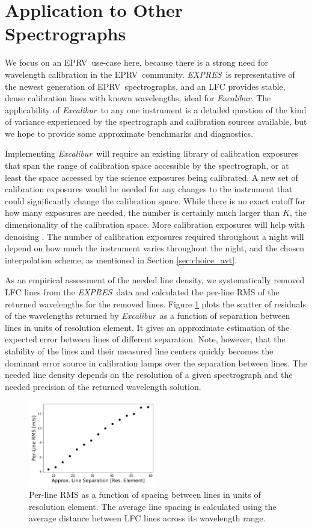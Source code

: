 \documentclass[modern]{aastex63}
\newcommand{\project}[1]{\textsl{#1}}
\newcommand{\name}{\project{Excalibur}}
\newcommand{\acronym}[1]{{\small{#1}}}
\newcommand{\expres}{\project{\acronym{EXPRES}}}
\newcommand{\eprv}{\acronym{EPRV}}
\begin{document}
\section{Application to Other Spectrographs}
\label{sec:others}
We focus on an \eprv\ use-case here, because there is a strong need for wavelength calibration in the \eprv\ community.  \expres\ is representative of the newest generation of \eprv\ spectrographs, and an LFC provides stable, dense calibration lines with known wavelengths, ideal for \name.  The applicability of \name\ to any one instrument is a detailed question of the kind of variance experienced by the spectrograph and calibration sources available, but we hope to provide some approximate benchmarks and diagnostics.

Implementing \name\ will require an existing library of calibration exposures that span the range of calibration space accessible by the spectrograph, or at least the space accessed by the science exposures being calibrated.  A new set of calibration exposures would be needed for any changes to the instrument that could significantly change the calibration space.  While there is no exact cutoff for how many exposures are needed, the number is certainly much larger than $K$, the dimensionality of the calibration space.  More calibration exposures will help with denoising .  The number of calibration exposures required throughout a night will depend on how much the instrument varies throughout the night, and the chosen interpolation scheme, as mentioned in Section \ref{sec:choice_avt}.

As an empirical assessment of the needed line density, we systematically removed LFC lines from the \expres\ data and calculated the per-line RMS of the returned wavelengths for the removed lines.  Figure \ref{fig:density} plots the scatter of residuals of the wavelengths returned by \name\ as a function of separation between lines in units of resolution element.  It gives an approximate estimation of the expected error between lines of different separation.  Note, however, that the stability of the lines and their measured line centers quickly becomes the dominant error source in calibration lamps over the separation between lines.  The needed line density depends on the resolution of a given spectrograph and the needed precision of the returned wavelength solution.

\begin{figure}[h]
\centering
\includegraphics[width=0.5\textwidth]{Figures/lfcDensityTest.pdf}
\caption{Per-line RMS as a function of spacing between lines in units of resolution element.  The average line spacing is calculated using the average distance between LFC lines across its wavelength range.}
\label{fig:density}
\end{figure} 
\end{document}
